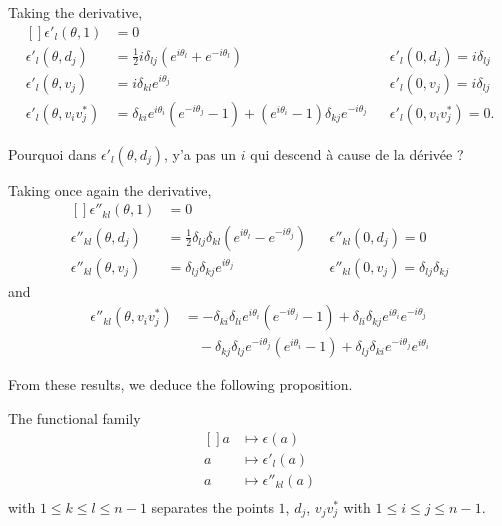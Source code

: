 Taking the derivative,
\begin{equation}
    \begin{aligned}[]
        \epsilon'_l(\theta,1)&=0\\
        \epsilon'_l(\theta,d_j)&=\frac{ 1 }{2}i\delta_{lj}( e^{i\theta_l}+ e^{-i\theta_l})                             &&\epsilon'_l(0,d_j)=i\delta_{lj}\\
        \epsilon'_l(\theta,v_j)&=i\delta_{kl} e^{i\theta_j}                                                           &&\epsilon'_l(0,v_j)=i\delta_{lj}\\
        \epsilon'_l(\theta,v_iv_j^*)&=\delta_{ki} e^{i\theta_i}( e^{-i\theta_j}-1)+( e^{i\theta_i}-1)\delta_{kj} e^{-i\theta_j}     &&\epsilon'_l(0,v_iv_j^*)=0.
    \end{aligned}
\end{equation}

\begin{probleme}
    Pourquoi dans $\epsilon'_l(\theta,d_j)$, y'a pas un $i$ qui descend à cause de la dérivée ?
\end{probleme}

Taking once again the derivative,
\begin{equation}
    \begin{aligned}[]
        \epsilon''_{kl}(\theta,1)&=0\\
        \epsilon''_{kl}(\theta,d_j)&=\frac{ 1 }{2}\delta_{lj}\delta_{kl}( e^{i\theta_l}- e^{-i\theta_j})&&\epsilon''_{kl}(0,d_j)=0\\
        \epsilon''_{kl}(\theta,v_j)&=\delta_{lj}\delta_{kj} e^{i\theta_j}&&\epsilon''_{kl}(0,v_j)=\delta_{lj}\delta_{kj}
    \end{aligned}
\end{equation}
and
\begin{subequations}
    \begin{align}
        \epsilon''_{kl}(\theta,v_iv_j^*)&
        =-\delta_{ki}\delta_{li} e^{i\theta_i}( e^{-i\theta_j}-1)
        +\delta_{li}\delta_{kj} e^{i\theta_i} e^{-i\theta_j}\\
        &\quad-\delta_{kj}\delta_{lj} e^{-i\theta_j} ( e^{i\theta_i}-1)
        +\delta_{lj}\delta_{ki} e^{-i\theta_j} e^{i\theta_i}        \label{SubEqepsppsurvvs}
    \end{align}
\end{subequations}


From these results, we deduce the following proposition.
\begin{proposition}
    The functional family
    \begin{equation}
        \begin{aligned}[]
            a&\mapsto\epsilon(a)\\
            a&\mapsto\epsilon'_l(a)\\
            a&\mapsto\epsilon''_{kl}(a)\\
        \end{aligned}
    \end{equation}
    with $1\leq k\leq l\leq n-1$ separates the points $1$, $d_j$, $v_jv_j^*$ with $1\leq i\leq j\leq n-1$.
\end{proposition}

